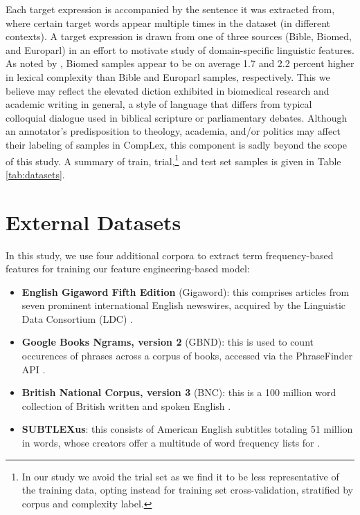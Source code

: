 \documentclass{dcthesis}
\theoremstyle{definition}
\theoremstyle{remark}
\begin{document}
Each target expression is accompanied by the sentence it was extracted from, where certain target words appear multiple times in the dataset (in different contexts). A target expression is drawn from one of three sources (Bible, Biomed, and Europarl) in an effort to motivate study of domain-specific linguistic features. As noted by \citet{shardlow2020complex}, Biomed samples appear to be on average 1.7 and 2.2 percent higher in lexical complexity than Bible and Europarl samples, respectively. This we believe may reflect the elevated diction exhibited in biomedical research and academic writing in general, a style of language that differs from typical colloquial dialogue used in biblical scripture or parliamentary debates. Although an annotator's predisposition to theology, academia, and/or politics may affect their labeling of samples in CompLex, this component is sadly beyond the scope of this study. A summary of train, trial,\footnote{In our study we avoid the trial set as we find it to be less representative of the training data, opting instead for training set cross-validation, stratified by corpus and complexity label.} and test set samples is given in Table \ref{tab:datasets}.

\section{External Datasets}

In this study, we use four additional corpora to extract term frequency-based features for training our feature engineering-based model:

\begin{itemize}
  \item \textbf{English Gigaword Fifth Edition} (Gigaword): this comprises articles from seven prominent international English newswires, acquired by the Linguistic Data Consortium (LDC) \citep{gigaword}.
  \item \textbf{Google Books Ngrams, version 2} (GBND): this is used to count occurences of phrases across a corpus of books, accessed via the PhraseFinder API \citep{phrasefinder}.
  \item \textbf{British National Corpus, version 3} (BNC): this is a 100 million word collection of British written and spoken English \citep{BNC}.
  \item \textbf{SUBTLEXus}: this consists of American English subtitles totaling 51 million in words, whose creators offer a multitude of word frequency lists for \citep{Brysbaert2009MovingBK}.
\end{itemize}
\end{document}
